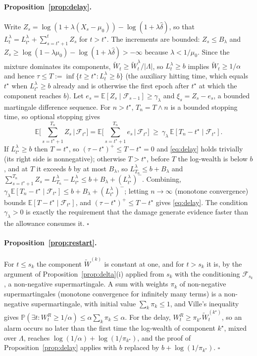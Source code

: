 \documentclass[12pt,a4paper]{article}
\newenvironment{revblock}{}{}
\newenvironment{revblock}{\begingroup\color{revcol}}{\endgroup}
\newcommand{\rtwo}[1]{#1}
\newcommand{\rtwo}[1]{{\color{revcolb}#1}}
\newcommand{\E}{\mathbb{E}}
\newcommand{\Prob}{\mathbb{P}}
\newcommand{\F}{\mathcal{F}}
\begin{document}
\begin{revblock}
\paragraph{Proposition~\ref{prop:delay}.}
Write $Z_s=\log(1+\lambda(X_s-\mu_0))-\log(1+\lambda\hat\delta)$, so that $L^\lambda_t=L^\lambda_{t^\star}+\sum_{s=t^\star+1}^tZ_s$ for $t>t^\star$. The increments are bounded: $Z_s\le B_\lambda$ and $Z_s\ge\log(1-\lambda\mu_0)-\log(1+\lambda\hat\delta)>-\infty$ because $\lambda<1/\mu_0$. \rtwo{Since the mixture dominates its components, $\widetilde W_t\ge\widetilde W^\lambda_t/|\Lambda|$, so $L^\lambda_t\ge b$ implies $\widetilde W_t\ge1/\alpha$ and hence \rtwo{$\tau\le T:=\inf\{t\ge t^\star:L^\lambda_t\ge b\}$ (the auxiliary hitting time, which equals $t^\star$ when $L^\lambda_{t^\star}\ge b$ already and is otherwise the first epoch after $t^\star$ at which the component reaches $b$)}.} Let $e_s=\E[Z_s\mid\F_{s-1}]\ge\gamma_\lambda$ and $\xi_s=Z_s-e_s$, a bounded martingale difference sequence. For $n>t^\star$, $T_n=T\wedge n$ is a bounded stopping time, so optional stopping gives
\[
\E\Big[\sum_{s=t^\star+1}^{T_n}Z_s\,\Big|\,\F_{t^\star}\Big]=\E\Big[\sum_{s=t^\star+1}^{T_n}e_s\,\Big|\,\F_{t^\star}\Big]\ \ge\ \gamma_\lambda\,\E[T_n-t^\star\mid\F_{t^\star}].
\]
\rtwo{If $L^\lambda_{t^\star}\ge b$ then \rtwo{$T=t^\star$, so $(\tau-t^\star)^+\le T-t^\star=0$ and \eqref{eq:delay} holds trivially (its right side is nonnegative)}; otherwise \rtwo{$T>t^\star$}, before $T$ the log-wealth is below $b$, and at $T$ it exceeds $b$ by at most $B_\lambda$, so $L^\lambda_{T_n}\le b+B_\lambda$ and $\sum_{s=t^\star+1}^{T_n}Z_s=L^\lambda_{T_n}-L^\lambda_{t^\star}\le b+B_\lambda+(L^\lambda_{t^\star})^-$.} Combining, $\gamma_\lambda\E[T_n-t^\star\mid\F_{t^\star}]\le b+B_\lambda+(L^\lambda_{t^\star})^-$; letting $n\to\infty$ (monotone convergence) bounds $\E[T-t^\star\mid\F_{t^\star}]$, and $(\tau-t^\star)^+\le T-t^\star$ gives \eqref{eq:delay}. The condition $\gamma_\lambda>0$ is exactly the requirement that the damage generate evidence faster than the allowance consumes it. \hfill$\square$

\paragraph{Proposition~\ref{prop:restart}.}
For $t\le s_k$ the component $\widetilde W^{(k)}$ is constant at one, and for $t>s_k$ it is, by the argument of Proposition~\ref{prop:delta}(i) applied from $s_k$ with the conditioning $\F_{s_k}$, a non-negative supermartingale. A sum with weights $\pi_k$ of non-negative supermartingales (monotone convergence for infinitely many terms) is a non-negative supermartingale, with initial value $\sum_k\pi_k\le1$, and Ville's inequality gives $\Prob(\exists t:W^R_t\ge1/\alpha)\le\alpha\sum_k\pi_k\le\alpha$. For the delay, $W^R_t\ge\pi_{k^\star}\widetilde W^{(k^\star)}_t$, so an alarm occurs no later than the first time the log-wealth of component $k^\star$, mixed over $\Lambda$, reaches $\log(1/\alpha)+\log(1/\pi_{k^\star})$, and the proof of Proposition~\ref{prop:delay} applies with $b$ replaced by $b+\log(1/\pi_{k^\star})$. \hfill$\square$
\end{revblock}
\end{document}

